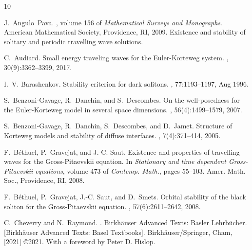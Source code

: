 \documentclass[11pt]{article}
\theoremstyle{plain}
\theoremstyle{definition}
\theoremstyle{remark}
\numberwithin{equation}{section}
\begin{document}
{		
		
		   
\begin{thebibliography}{10}
	
	J.~Angulo~Pava.
	, volume 156 of {\em Mathematical
		Surveys and Monographs}.
	\newblock American Mathematical Society, Providence, RI, 2009.
	\newblock Existence and stability of solitary and periodic travelling wave
	solutions.
	
	C.~Audiard.
	\newblock Small energy traveling waves for the {E}uler-{K}orteweg system.
	, 30(9):3362--3399, 2017.
	
	I.~V. Barashenkov.
	\newblock Stability criterion for dark solitons.
	, 77:1193--1197, Aug 1996.
	
	S.~Benzoni-Gavage, R.~Danchin, and S.~Descombes.
	\newblock On the well-posedness for the {E}uler-{K}orteweg model in several
	space dimensions.
	, 56(4):1499--1579, 2007.
	
	S.~Benzoni-Gavage, R.~Danchin, S.~Descombes, and D.~Jamet.
	\newblock Structure of {K}orteweg models and stability of diffuse interfaces.
	, 7(4):371--414, 2005.
	
	F.~B\'ethuel, P.~Gravejat, and J.-C. Saut.
	\newblock Existence and properties of travelling waves for the
	{G}ross-{P}itaevskii equation.
	\newblock In {\em Stationary and time dependent {G}ross-{P}itaevskii
		equations}, volume 473 of {\em Contemp. Math.}, pages 55--103. Amer. Math.
	Soc., Providence, RI, 2008.
	
	F.~B{\'e}thuel, P.~Gravejat, J.-C. Saut, and D.~Smets.
	\newblock Orbital stability of the black soliton for the {G}ross-{P}itaevskii
	equation.
	, 57(6):2611--2642, 2008.
	
	C.~Cheverry and N.~Raymond.
	.
	\newblock Birkh\"{a}user Advanced Texts: Basler Lehrb\"{u}cher. [Birkh\"{a}user
	Advanced Texts: Basel Textbooks]. Birkh\"{a}user/Springer, Cham, [2021]
	\copyright 2021.
	\newblock With a foreword by Peter D. Hislop.
	

\end{thebibliography}}
\end{document}
